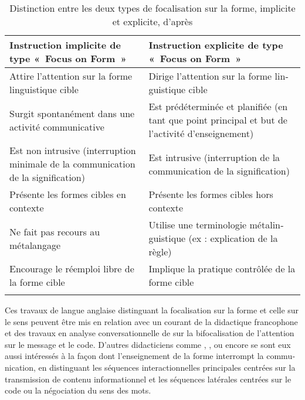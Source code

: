 \documentclass[output=paper]{langscibook}
\begin{document}
\begin{otherlanguage}{french}
\begin{table}
\caption{\label{tab:watorek:1} Distinction entre les deux types de focalisation sur la forme, implicite et explicite, d’après \citet{Véronique2019}
}
\begin{tabularx}{\textwidth}{QQ}
\lsptoprule
{Instruction implicite de type «~Focus on Form~»} & {Instruction explicite de type «~Focus on Form~»}\\\midrule
Attire l’attention sur la forme linguistique cible & Dirige l’attention sur la forme linguistique cible\\
Surgit spontanément dans une activité communicative & Est prédéterminée et planifiée (en tant que point principal et but de l’activité d’enseignement)\\
Est non intrusive (interruption minimale de la communication de la signification) & Est intrusive (interruption de la communication de la signification)\\
Présente les formes cibles en contexte & Présente les formes cibles hors contexte\\
Ne fait pas recours au métalangage & Utilise une terminologie métalinguistique (ex : explication de la règle)\\
Encourage le réemploi libre de la forme cible & Implique la pratique contrôlée de la forme cible\\
\lspbottomrule
\end{tabularx}
\end{table}

Ces travaux de langue anglaise distinguant la focalisation sur la forme et celle sur le sens peuvent être mis en relation avec un courant de la didactique francophone et des travaux en analyse conversationnelle de \citet{BangeEtAl2005} sur la bifocalisation de l’attention sur le message et le code. D’autres didacticiens comme \citet{Cicurel2002}, \citet{GajoEtAl2004}, ou encore  \citet{Py1989,Py1993} se sont eux aussi intéressés à la façon dont l’enseignement de la forme interrompt la communication, en distinguant les séquences interactionnelles principales centrées sur la transmission de contenu informationnel et les séquences latérales centrées sur le code ou la négociation du sens des mots.


\end{otherlanguage}
\end{document}
